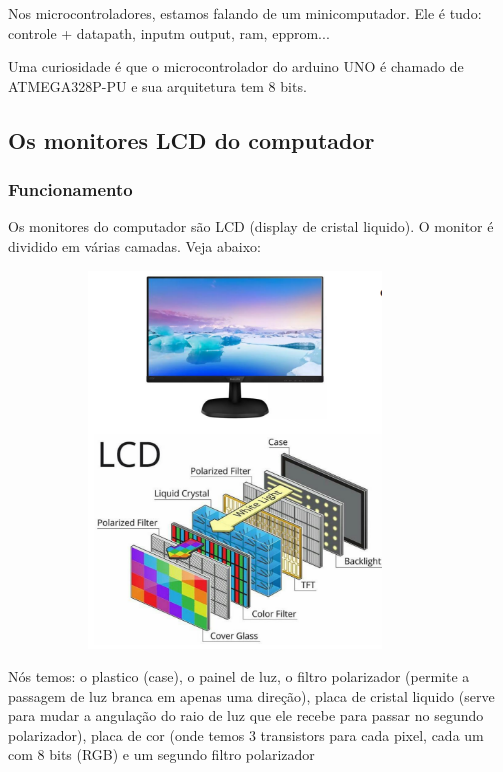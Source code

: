 \documentclass[12pt,a4paper]{report}
\begin{document}
	Nos microcontroladores, estamos falando de um minicomputador. Ele é tudo: controle + datapath, inputm output, ram, epprom...
	
	Uma curiosidade é que o microcontrolador do arduino UNO é chamado de ATMEGA328P-PU e sua arquitetura tem 8 bits.
	
	\subsection{Os monitores LCD do computador}
	
	\subsubsection{Funcionamento}
	
	Os monitores do computador são LCD (display de cristal liquido). O monitor é dividido em várias camadas. Veja abaixo:
	
	\begin{center}
		
		\includegraphics[width=12cm,height=10cm,keepaspectratio=false]{imagens-teoria/monitor.png}
		
	\end{center}
	
	Nós temos: o plastico (case), o painel de luz, o filtro polarizador (permite a passagem de luz branca em apenas uma direção), placa de cristal liquido (serve para mudar a angulação do raio de luz que ele recebe para passar no segundo polarizador), placa de cor (onde temos 3 transistors para cada pixel, cada um com 8 bits (RGB) e um segundo filtro polarizador
	
\end{document}
